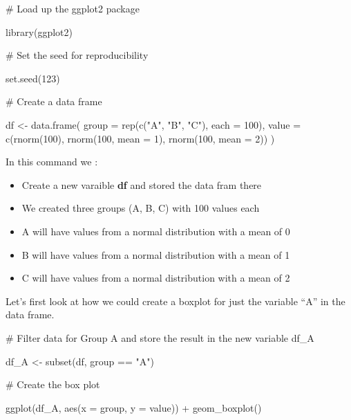 \documentclass[
  letterpaper,
  DIV=11,
  numbers=noendperiod]{scrreprt}
\newenvironment{Shaded}{\begin{snugshade}}{\end{snugshade}}
\newcommand{\AttributeTok}[1]{\textcolor[rgb]{0.40,0.45,0.13}{#1}}
\newcommand{\CommentTok}[1]{\textcolor[rgb]{0.37,0.37,0.37}{#1}}
\newcommand{\DecValTok}[1]{\textcolor[rgb]{0.68,0.00,0.00}{#1}}
\newcommand{\FunctionTok}[1]{\textcolor[rgb]{0.28,0.35,0.67}{#1}}
\newcommand{\NormalTok}[1]{\textcolor[rgb]{0.00,0.23,0.31}{#1}}
\newcommand{\OtherTok}[1]{\textcolor[rgb]{0.00,0.23,0.31}{#1}}
\newcommand{\SpecialCharTok}[1]{\textcolor[rgb]{0.37,0.37,0.37}{#1}}
\newcommand{\StringTok}[1]{\textcolor[rgb]{0.13,0.47,0.30}{#1}}
\providecommand{\tightlist}{%
  \setlength{\itemsep}{0pt}\setlength{\parskip}{0pt}}\usepackage{longtable,booktabs,array}
\begin{document}
\begin{Shaded}
\begin{Highlighting}[]
\CommentTok{\# Load up the ggplot2 package}

\FunctionTok{library}\NormalTok{(ggplot2)}

\CommentTok{\# Set the seed for reproducibility}

\FunctionTok{set.seed}\NormalTok{(}\DecValTok{123}\NormalTok{)}

\CommentTok{\# Create a data frame}

\NormalTok{df }\OtherTok{\textless{}{-}} \FunctionTok{data.frame}\NormalTok{(}
  \AttributeTok{group =} \FunctionTok{rep}\NormalTok{(}\FunctionTok{c}\NormalTok{(}\StringTok{"A"}\NormalTok{, }\StringTok{"B"}\NormalTok{, }\StringTok{"C"}\NormalTok{), }\AttributeTok{each =} \DecValTok{100}\NormalTok{),}
  \AttributeTok{value =} \FunctionTok{c}\NormalTok{(}\FunctionTok{rnorm}\NormalTok{(}\DecValTok{100}\NormalTok{), }\FunctionTok{rnorm}\NormalTok{(}\DecValTok{100}\NormalTok{, }\AttributeTok{mean =} \DecValTok{1}\NormalTok{), }\FunctionTok{rnorm}\NormalTok{(}\DecValTok{100}\NormalTok{, }\AttributeTok{mean =} \DecValTok{2}\NormalTok{))}
\NormalTok{)}
\end{Highlighting}
\end{Shaded}

In this command we :

\begin{itemize}
\tightlist
\item
  Create a new varaible \textbf{df} and stored the data fram there
\item
  We created three groups (A, B, C) with 100 values each
\item
  A will have values from a normal distribution with a mean of 0
\item
  B will have values from a normal distribution with a mean of 1
\item
  C will have values from a normal distribution with a mean of 2
\end{itemize}

Let's first look at how we could create a boxplot for just the variable
``A'' in the data frame.

\begin{Shaded}
\begin{Highlighting}[]
\CommentTok{\# Filter data for Group A and store the result in the new variable df\_A}

\NormalTok{df\_A }\OtherTok{\textless{}{-}} \FunctionTok{subset}\NormalTok{(df, group }\SpecialCharTok{==} \StringTok{"A"}\NormalTok{)}

\CommentTok{\# Create the box plot}

\FunctionTok{ggplot}\NormalTok{(df\_A, }\FunctionTok{aes}\NormalTok{(}\AttributeTok{x =}\NormalTok{ group, }\AttributeTok{y =}\NormalTok{ value)) }\SpecialCharTok{+}
  \FunctionTok{geom\_boxplot}\NormalTok{()}
\end{Highlighting}
\end{Shaded}
\end{document}
